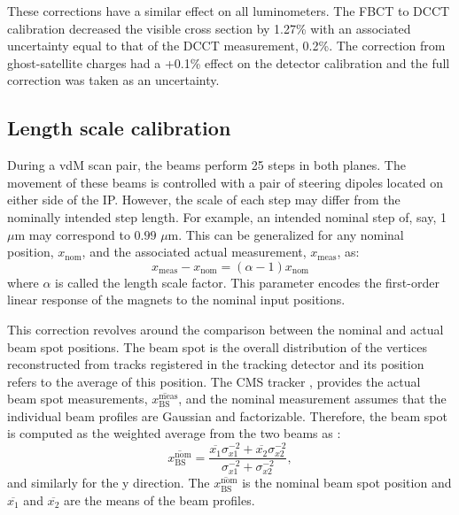 These corrections have a similar effect on all luminometers. The FBCT to DCCT calibration decreased the visible cross section by 1.27\% with an associated uncertainty equal to that of the DCCT measurement, 0.2\%. The correction from ghost-satellite charges had a +0.1\% effect on the detector calibration and the full correction was taken as an uncertainty.

\subsection{Length scale calibration}

During a vdM scan pair, the beams perform 25 steps in both planes. The movement of these beams is controlled with a pair of steering dipoles located on either side of the IP. However, the scale of each step may differ from the nominally intended step length. For example, an intended nominal step of, say, 1 $\mu$m may correspond to $0.99$ $\mu$m. This can be generalized for any nominal position, $x_{\mathrm{nom}}$, and the associated actual measurement, $x_{\mathrm{meas}}$, as:
\begin{equation}
	x_{\mathrm{meas}} - x_{\mathrm{nom}}= \left(\alpha - 1\right) x_{\mathrm{nom}}
\end{equation}
where $\alpha$ is called the length scale factor. This parameter encodes the first-order linear response of the magnets to the nominal input positions.

This correction revolves around the comparison between the nominal and actual beam spot positions. The beam spot is the overall distribution of the vertices reconstructed from tracks registered in the tracking detector and its position refers to the average of this position. The CMS tracker \cite{Sirunyan:2759951}, provides the actual beam spot measurements, $\overline{x^{\mathrm{meas}}_{\mathrm{BS}}}$, and the nominal measurement assumes that the individual beam profiles are Gaussian and factorizable. Therefore, the beam spot is computed as the weighted average from the two beams as \cite{CMS-PAS-LUM-22-001}:
\begin{equation}
	\overline{x^{\mathrm{nom}}_{\mathrm{BS}}} = \frac{\overline{x_1}\sigma_{x1}^{-2} + \overline{x_2}\sigma_{x2}^{-2}}{\sigma_{x1}^{-2} + \sigma_{x2}^{-2}},
\end{equation}
and similarly for the y direction. The $\overline{x^{\mathrm{nom}}_{\mathrm{BS}}}$ is the nominal beam spot position and $\overline{x_1}$ and $\overline{x_2}$ are the means of the beam profiles.


